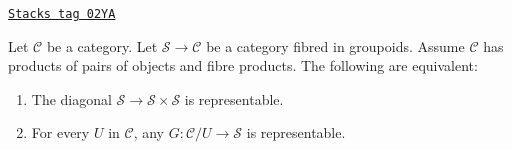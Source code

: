 \begin{lemma}
\label{categories-lemma-representable-diagonal-groupoids}
\href{https://stacks.math.columbia.edu/tag/02YA}{\texttt{Stacks tag 02YA}}

Let $\mathcal{C}$ be a category.
Let $\mathcal{S} \to \mathcal{C}$ be a category fibred in groupoids.
Assume $\mathcal{C}$ has products of pairs of objects and fibre products.
The following are equivalent:
\begin{enumerate}
\item The diagonal $\mathcal{S} \to \mathcal{S} \times \mathcal{S}$
is representable.
\item For every $U$ in $\mathcal{C}$, any $G : \mathcal{C}/U \to \mathcal{S}$
is representable.
\end{enumerate}
\end{lemma}

